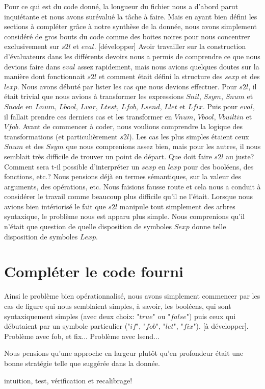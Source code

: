 \documentclass{article}
\begin{document}
Pour ce qui est du code donné, la longueur du fichier nous a d'abord parut inquiétante et nous avons surévalué la tâche à faire. Mais en ayant bien défini les sections à compléter grâce à notre synthèse de la donnée, nous avons simplement considéré de gros bouts du code comme des boites noires pour nous concentrer exclusivement sur $s2l$ et $eval$. [développer] Avoir travailler sur la construction d'évaluateurs dans les différents devoirs nous a permis de comprendre ce que nous devions faire dans $eval$ assez rapidement, mais nous avions quelques doutes sur la manière dont fonctionnait $s2l$ et comment était défini la structure des $sexp$ et des $lexp$. Nous avons débuté par lister les cas que nous devions effectuer. Pour $s2l$, il était trivial que nous avions à transformer les expressions $Snil$, $Ssym$, $Snum$ et $Snode$ en $Lnum$, $Lbool$, $Lvar$, $Ltest$, $Lfob$, $Lsend$, $Llet$ et $Lfix$. Puis pour $eval$, il fallait prendre ces derniers cas et les transformer en $Vnum$, $Vbool$, $Vbuiltin$ et $Vfob$. Avant de commencer à coder, nous voulions comprendre la logique des transformations (et particulièrement $s2l$). Les cas les plus simples étaient ceux $Snum$ et des $Ssym$ que nous comprenions assez bien, mais pour les autres, il nous semblait très difficile de trouver un point de départ. Que doit faire $s2l$ au juste? Comment sera t-il possible d'interpréter un $sexp$ en $lexp$ pour des booléens, des fonctions, etc.? Nous pensions déjà en termes sémantiques, sur la valeur des arguments, des opérations, etc. Nous faisions fausse route et cela nous a conduit à considérer le travail comme beaucoup plus difficile qu'il ne l'était.  Lorsque nous avions bien intériorisé le fait que $s2l$ manipule tout simplement des arbres syntaxique, le problème nous est apparu plus simple. Nous comprenions qu'il n'était que question de quelle disposition de symboles $Sexp$ donne telle disposition de symboles $Lexp$. 

\section{Compléter le code fourni}


Ainsi le problème bien opérationnalisé, nous avons simplement commencer par les cas de figure qui nous semblaient simples, à savoir, les booléens, qui sont syntaxiquement simples (avec deux choix: "$true$" ou "$false$") puis ceux qui débutaient par un symbole particulier ("$if$", "$fob$", "$let$", "$fix$"). [à développer]. Problème avec fob, et fix... Problème avec lsend...

Nous pensions qu'une approche en largeur plutôt qu'en profondeur était une bonne stratégie telle que suggérée dans la donnée. 

intuition, test, vérification et recalibrage!
\end{document}

